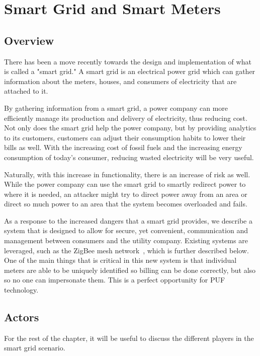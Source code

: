 
\chapter{Smart Grid and Smart Meters}
\label{chapter:doe}

\section{Overview}
There has been a move recently towards the design and implementation of what is called a "smart grid." A smart
grid is an electrical power grid which can gather information about the meters, houses, and consumers of
electricity that are attached to it.

By gathering information from a smart grid, a power company can more efficiently manage its production and delivery
of electricity, thus reducing cost. Not only does the smart grid help the power company, but by providing analytics to
its customers, customers can adjust their consumption habits to lower their bills as well. With the increasing cost of
fossil fuels and the increasing energy consumption of today's consumer, reducing wasted electricity will be very useful.

Naturally, with this increase in functionality, there is an increase of risk as well. While the power company can use
the smart grid to smartly redirect power to where it is needed, an attacker might try to direct power away from an
area or direct so much power to an area that the system becomes overloaded and fails.

As a response to the increased dangers that a smart grid provides, we describe a system that is designed to allow
for secure, yet convenient, communication and management between consumers and the utility company. Existing
systems are leveraged, such as the ZigBee mesh network~\cite{zigbee}, which is further described below.
One of the main things that is critical in this new system is that individual meters are able to be uniquely identified
so billing can be done correctly, but also so no one can impersonate them. This is a perfect opportunity for PUF
technology.

\section{Actors}
For the rest of the chapter, it will be useful to discuss the different players in the smart grid scenario.


